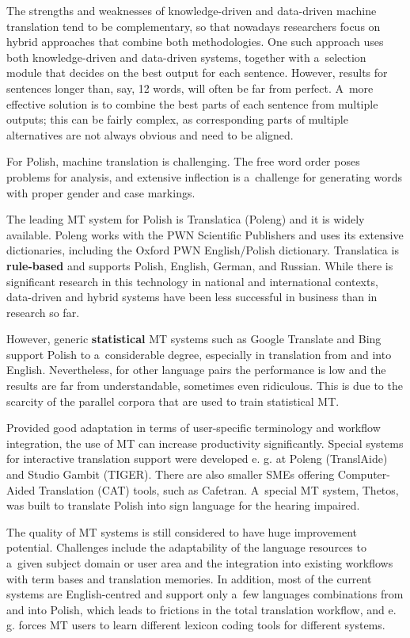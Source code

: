\begin{multicols}{2}
The strengths and weaknesses of knowledge-driven and data-driven
machine translation tend to be complementary, so that nowadays
researchers focus on hybrid approaches that combine both
methodologies. One such approach uses both knowledge-driven and
data-driven systems, together with a~selection module that decides on
the best output for each sentence. However, results for sentences
longer than, say, 12 words, will often be far from perfect. A~more
effective solution is to combine the best parts of each sentence from
multiple outputs; this can be fairly complex, as corresponding parts
of multiple alternatives are not always obvious and need to be
aligned. 


For Polish, machine translation is challenging. The free word order
poses problems for analysis, and extensive inflection is a~challenge
for generating words with proper gender and case markings. 

The leading MT system for Polish is Translatica (Poleng) and it is
widely available. Poleng works with the PWN Scientific Publishers and
uses its extensive dictionaries, including the Oxford PWN
English/Polish dictionary. Translatica is \textbf{rule-based} and
supports Polish, English, German, and Russian. While there is
significant research in this technology in national and international
contexts, data-driven and hybrid systems have been less successful in
business than in research so far. 

However, generic \textbf{statistical} MT systems such as Google
Translate and Bing support Polish to a~considerable degree, especially
in translation from and into English. Nevertheless, for other language
pairs the performance is low and the results are far from
understandable, sometimes even ridiculous. This is due to the scarcity
of the parallel corpora that are used to train statistical MT. 

Provided good adaptation in terms of user-specific terminology and
workflow integration, the use of MT can increase productivity
significantly. Special systems for interactive translation support
were developed e. g. at Poleng (TranslAide) and Studio Gambit (TIGER).
There are also smaller SMEs offering Computer-Aided Translation (CAT)
tools, such as Cafetran. A~special MT system, Thetos, was built to
translate Polish into sign language for the hearing impaired. 

The quality of MT systems is still considered to have huge improvement
potential. Challenges include the adaptability of the language
resources to a~given subject domain or user area and the integration
into existing workflows with term bases and translation memories. In
addition, most of the current systems are English-centred and support
only a~few languages combinations from and into Polish, which leads to
frictions in the total translation workflow, and e. g. forces MT users
to learn different lexicon coding tools for different systems. 


\end{multicols}
